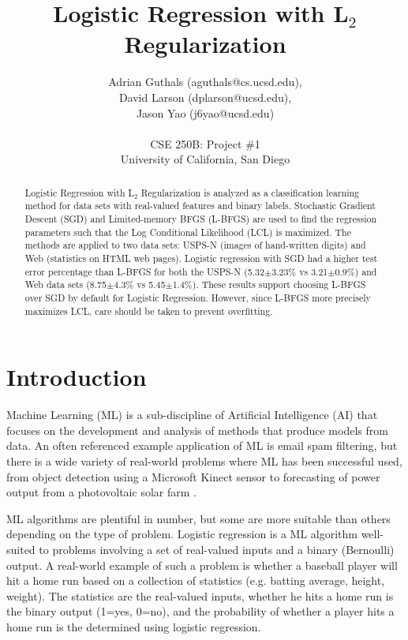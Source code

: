 \documentclass[10pt]{article}
\title{Logistic Regression with L$_2$ Regularization}
\author{Adrian Guthals (aguthals@cs.ucsd.edu),\\
David Larson (dplarson@ucsd.edu),\\
Jason Yao (j6yao@ucsd.edu)\\
\\
CSE 250B: Project \#1 \\
University of California, San Diego \\
}
\begin{document}
\maketitle


\begin{abstract}
Logistic Regression with L$_2$ Regularization is analyzed as a classification learning method for data sets with real-valued features and binary labels. Stochastic Gradient Descent (SGD) and Limited-memory BFGS (L-BFGS) are used to find the regression parameters such that the Log Conditional Likelihood (LCL) is maximized. The methods are applied to two data sets: USPS-N (images of hand-written digits) and Web (statistics on HTML web pages). Logistic regression with SGD had a higher test error percentage than L-BFGS for both the USPS-N (5.32$\pm$3.23\% vs 3.21$\pm$0.9\%) and Web data sets (8.75$\pm$4.3\% vs 5.45$\pm$1.4\%). These results support choosing L-BFGS over SGD by default for Logistic Regression. However, since L-BFGS more precisely maximizes LCL, care should be taken to prevent overfitting.
\end{abstract}



\section{Introduction}
\label{sec:intro}

Machine Learning (ML) is a sub-discipline of Artificial Intelligence (AI) that focuses on the development and analysis of methods that produce models from data. An often referenced example application of ML is email spam filtering, but there is a wide variety of real-world problems where ML has been successful used, from object detection using a Microsoft Kinect sensor \cite{Kinect} to forecasting of power output from a photovoltaic solar farm \cite{solar}.

ML algorithms are plentiful in number, but some are more suitable than others depending on the type of problem. Logistic regression is a ML algorithm well-suited to problems involving a set of real-valued inputs and a binary (Bernoulli) output. A real-world example of such a problem is whether a baseball player will hit a home run based on a collection of statistics (e.g. batting average, height, weight). The statistics are the real-valued inputs, whether he hits a home run is the binary output (1=yes, 0=no), and the probability of whether a player hits a home run is the determined using logistic regression. 
\end{document}
